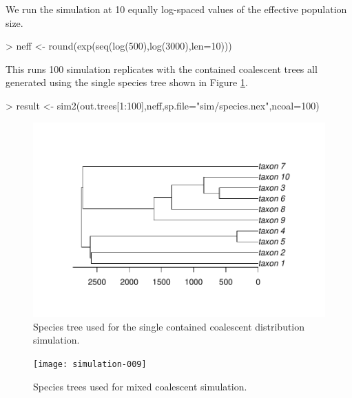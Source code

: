 \documentclass{article}
\begin{document}
We run the simulation at 10 equally log-spaced values of the effective
population size.
\begin{Schunk}
\begin{Sinput}
> neff <- round(exp(seq(log(500),log(3000),len=10)))
\end{Sinput}
\end{Schunk}
This runs 100 simulation replicates with the contained coalescent
trees all generated using the single species tree shown in Figure \ref{fig:single-species}.
\begin{Schunk}
\begin{Sinput}
> result <- sim2(out.trees[1:100],neff,sp.file="sim/species.nex",ncoal=100)
\end{Sinput}
\end{Schunk}

\begin{figure}
  \centering
\includegraphics{simulation-008}
\caption{Species tree used for the single contained coalescent distribution simulation.}
  \label{fig:single-species}
\end{figure}

\begin{figure}
  \centering
\texttt{[image: simulation-009]}
  \caption{Species trees used for mixed coalescent simulation.}
\label{fig:mixed-species}  
\end{figure}
\end{document}
